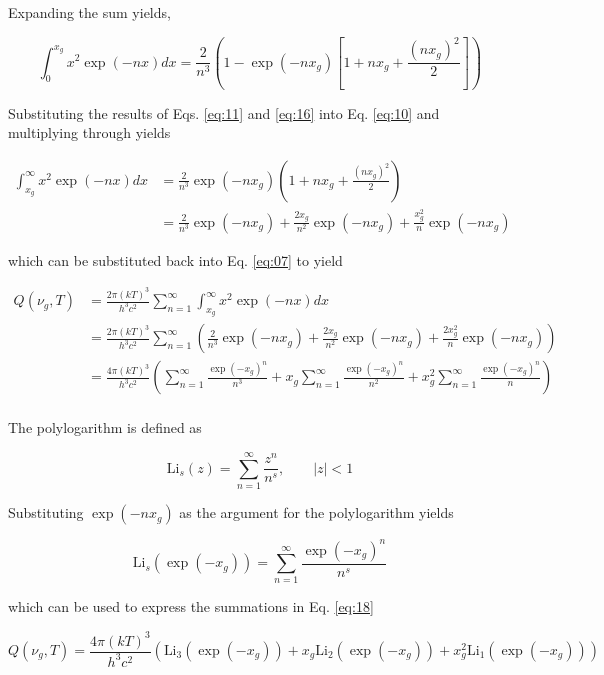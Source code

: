\documentclass[letterpaper,12pt]{article}
\newcommand{\Li}{\textrm{Li}}
\begin{document}
\noindent Expanding the sum yields,

\begin{equation} \label{eq:16}
\int_{0}^{x_{g}} x^{2} \exp(-nx) dx = \frac{2}{n^{3}} \left( 1 - \exp(-nx_{g}) \left[1 + nx_{g} + \frac{ (nx_{g})^{2} }{2} \right] \right)
\end{equation}

Substituting the results of Eqs. \ref{eq:11} and \ref{eq:16} into Eq. \ref{eq:10} and multiplying through yields

\begin{align} \label{eq:17}
\int_{x_{g}}^{\infty} x^{2} \exp(-nx) dx &= \frac{2}{n^{3}} \exp(-nx_{g}) \left( 1 + nx_{g} + \frac{ (nx_{g})^{2} }{2} \right) \\
 &= \frac{2}{n^{3}} \exp(-nx_{g}) + \frac{2x_{g}}{n^{2}} \exp(-nx_{g}) + \frac{x_{g}^{2}}{n} \exp(-nx_{g})
\end{align}

\noindent which can be substituted back into Eq. \ref{eq:07} to yield

\begin{align} \label{eq:18}
Q(\nu_{g}, T) &= \frac{2\pi (kT)^{3}}{h^{3} c^{2}} \sum_{n = 1}^{\infty} \int_{x_{g}}^{\infty} x^{2} \exp(-nx) dx \\
 &= \frac{2\pi (kT)^{3}}{h^{3} c^{2}} \sum_{n = 1}^{\infty} \left( \frac{2}{n^{3}} \exp(-nx_{g}) + \frac{2x_{g}}{n^{2}} \exp(-nx_{g}) + \frac{2x_{g}^{2}}{n} \exp(-nx_{g}) \right) \\
 &= \frac{4\pi (kT)^{3}}{h^{3} c^{2}} \left(\sum_{n = 1}^{\infty} \frac{\exp(-x_{g})^{n}}{n^{3}} + x_{g} \sum_{n = 1}^{\infty} \frac{\exp(-x_{g})^{n}}{n^{2}} + x_{g}^{2} \sum_{n = 1}^{\infty} \frac{\exp(-x_{g})^{n}}{n} \right) \\
\end{align}

The polylogarithm is defined as

\begin{equation} \label{eq:22}
\Li_{s}(z) = \sum_{n = 1}^{\infty} \frac{z^{n}}{n^{s}}, \qquad |z| < 1
\end{equation}

\noindent Substituting $\exp(-nx_{g})$ as the argument for the polylogarithm yields

\begin{equation} \label{eq:23}
\Li_{s} \left(\exp(-x_{g}) \right) = \sum_{n = 1}^{\infty} \frac{\exp(-x_{g})^{n}}{n^{s}}
\end{equation}

\noindent which can be used to express the summations in Eq. \ref{eq:18}

\begin{equation} \label{eq:24}
Q(\nu_{g}, T) = \frac{4\pi (kT)^{3}}{h^{3} c^{2}} \left(\Li_{3}(\exp(-x_{g})) + x_{g} \Li_{2}(\exp(-x_{g})) + x_{g}^{2} \Li_{1}(\exp(-x_{g})) \right) 
\end{equation}


% 
% 
\end{document}
